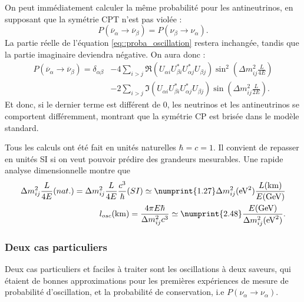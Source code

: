             On peut immédiatement calculer la même probabilité pour les antineutrinos, en supposant que la symétrie CPT n'est pas violée : 
            \begin{equation}
                P(\overline{\nu}_{\alpha}\to\overline{\nu}_{\beta}) = P(\nu_{\beta}\to\nu_{\alpha}).
            \end{equation}
            La partie réelle de l'équation \eqref{eq::proba_oscillation} restera inchangée, tandis que la partie imaginaire deviendra négative. On aura donc :
            \begin{equation}
                \begin{split}
                    P(\overline{\nu}_{\alpha}\to\overline{\nu}_{\beta}) = \delta_{\alpha\beta} & - 4\sum_{i>j}\Re(U_{\alpha i}U_{\beta i}^*U_{\alpha j}^*U_{\beta j})\sin^2\left(\Delta m_{ij}^2\frac{L}{4E}\right) \\
                    & -2\sum_{i>j}\Im(U_{\alpha i}U_{\beta i}^*U_{\alpha j}^*U_{\beta j})\sin\left(\Delta m_{ij}^2\frac{L}{2E}\right).
                \end{split}
            \end{equation}
            Et donc, si le dernier terme est différent de 0, les neutrinos et les antineutrinos se comportent différemment, montrant que la symétrie CP est brisée dans le modèle standard.
            
            Tous les calculs ont été fait en unités naturelles $\hbar = c = 1$. Il convient de repasser en unités SI si on veut pouvoir prédire des grandeurs mesurables. Une rapide analyse dimensionnelle montre que 
            \begin{eqnarray}
                \Delta m_{ij}^2\frac{L}{4E}(nat.)
                = \Delta m_{ij}^2\frac{L}{4E}\frac{c^3}{\hbar}(SI)
                \simeq \numprint{1.27}\Delta m_{ij}^2(\si{\electronvolt\squared})\frac{L(\si{\kilo\meter})}{E(\si{\giga\electronvolt})} \\ 
                l_{osc}(\si{\kilo\meter}) = \frac{4\pi E\hbar}{\Delta m_{ij}^2c^3} \simeq \numprint{2.48}\frac{E(\si{\giga\electronvolt})}{\Delta m_{ij}^2(\si{\electronvolt\squared})}.
            \end{eqnarray}
            
        \subsubsection{Deux cas particuliers}
            Deux cas particuliers et faciles à traiter sont les oscillations à deux saveurs, qui étaient de bonnes approximations pour les premières expériences de mesure de probabilité d'oscillation, et la probabilité de conservation, i.e $P(\nu_{\alpha}\to\nu_{\alpha})$.
            
